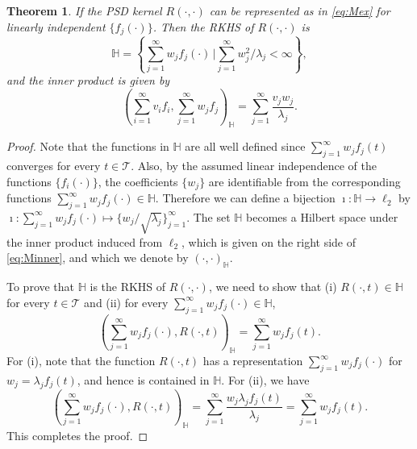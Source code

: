 \documentclass[11pt]{article}
\theoremstyle{plain}
\newtheorem{theorem}{\quad\quad Theorem}
\theoremstyle{definition}
\theoremstyle{remark}
\begin{document}
\begin{theorem}\label{RKHSrepre}
    If the PSD kernel $R(\cdot,\cdot)$  can be represented as in \eqref{eq:Mex} for linearly independent $\{f_j(\cdot)\}$.
    Then the RKHS of $R(\cdot,\cdot)$ is
    \begin{equation*}
        \mathbb H = \left\{   \sum_{j=1}^\infty w_j f_j(\cdot) \,\Big| \sum_{j=1}^\infty w_j^2/\lambda_j <\infty  \right\},
    \end{equation*}
    and the inner product is given by
    \begin{equation}\label{eq:Minner}
    \left(\sum_{i=1}^\infty v_i f_i, \sum_{j=1}^\infty w_j f_j \right)_{\mathbb H}
    =\sum_{j=1}^\infty \frac{v_j w_j}{\lambda_j}.
\end{equation}
\end{theorem}
\begin{proof}
    Note that the functions in $\mathbb H$ are all well defined since 
    $
    \sum_{j=1}^\infty w_j f_j(t)
    $ converges for every $t\in \mathcal T$.
    Also, by the assumed linear independence of the functions $\{f_i(\cdot)\}$, the coefficients $\{w_j\}$ are identifiable from the corresponding functions $\sum_{j=1}^\infty w_j f_j(\cdot) \in \mathbb H$.
    Therefore we can define a bijection $\imath: \mathbb H \to \ell_2$ by $\imath: \sum_{j=1}^\infty w_j f_j(\cdot) \mapsto \{w_j/\sqrt{\lambda_j}\}_{j=1}^\infty$.
    The set $\mathbb H$ becomes a Hilbert space under the inner product induced from $\ell_2$, which is given on the right side of \eqref{eq:Minner}, and which we denote by $(\cdot,\cdot)_{\mathbb H}$.

    To prove that $\mathbb H$ is the RKHS of $R(\cdot,\cdot)$, we need to show that (i) $R(\cdot, t)\in \mathbb H$ for every $t\in \mathcal T$ and (ii) for every $\sum_{j=1}^\infty w_j f_j(\cdot)\in \mathbb H$,
    \begin{equation*}
        \left(\sum_{j=1}^\infty w_j f_j(\cdot), R(\cdot,t)\right)_{\mathbb H} =\sum_{j=1}^\infty w_j f_j(t).
    \end{equation*}
    For (i), note that the function $R(\cdot, t)$ has a representation $\sum_{j=1}^\infty w_j f_j(\cdot)$ for $w_j=\lambda_j f_j(t)$, and hence is contained in $\mathbb H$.
    For (ii), we have
    \begin{equation*}
        \left(\sum_{j=1}^\infty w_j f_j(\cdot), R(\cdot,t)\right)_{\mathbb H} 
        =
        \sum_{j=1}^\infty \frac{ w_j \lambda_j f_j(t)}{\lambda_j}
        =\sum_{j=1}^\infty w_j f_j(t).
    \end{equation*}
    This completes the proof.
\end{proof}
\end{document}
